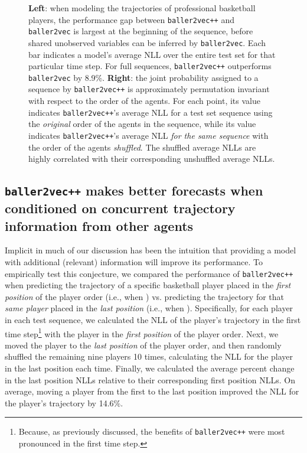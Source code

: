 \documentclass{article}
\newcommand{\btv}{\texttt{baller2vec}}
\newcommand{\btvpp}{\texttt{baller2vec++}}
\begin{document}
\begin{figure}[h]
\centering
{}
\caption{\textbf{Left}: when modeling the trajectories of professional basketball players, the performance gap between \btvpp{} and \btv{} is largest at the beginning of the sequence, before shared unobserved variables can be inferred by \btv{}.
Each bar indicates a model's average NLL over the entire test set for that particular time step.
For full sequences, \btvpp{} outperforms \btv{} by 8.9\%.
\textbf{Right}: the joint probability assigned to a sequence by \btvpp{} is approximately permutation invariant with respect to the order of the agents.
For each point, its  value indicates \btvpp{}'s average NLL for a test set sequence using the \textit{original} order of the agents in the sequence, while its  value indicates \btvpp{}'s average NLL \textit{for the same sequence} with the order of the agents \textit{shuffled}.
The shuffled average NLLs are highly correlated with their corresponding unshuffled average NLLs.
}
\label{fig:plots}
\end{figure}

\subsection{\btvpp{} makes better forecasts when conditioned on concurrent trajectory information from other agents}\label{sec:conditioning}

Implicit in much of our discussion has been the intuition that providing a model with additional (relevant) information will improve its performance.
To empirically test this conjecture, we compared the performance of \btvpp{} when predicting the trajectory of a specific basketball player placed in the \textit{first position} of the player order (i.e., when ) vs. predicting the trajectory for that \textit{same player} placed in the \textit{last position} (i.e., when ).
Specifically, for each player in each test sequence, we calculated the NLL of the player's trajectory in the first time step\footnote{Because, as previously discussed, the benefits of \btvpp{} were most pronounced in the first time step.} with the player in the \textit{first position} of the player order.
Next, we moved the player to the \textit{last position} of the player order, and then randomly shuffled the remaining nine players 10 times, calculating the NLL for the player in the last position each time.
Finally, we calculated the average percent change in the last position NLLs relative to their corresponding first position NLLs.
On average, moving a player from the first to the last position improved the NLL for the player's trajectory by 14.6\%.
\end{document}

